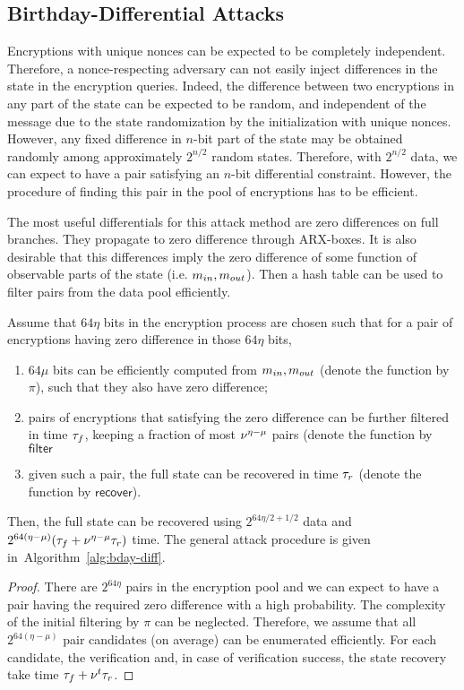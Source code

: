
\subsection{Birthday-Differential Attacks}

Encryptions with unique nonces can be expected to be completely independent. Therefore, a nonce-respecting adversary can not easily inject differences in the state in the encryption queries. Indeed, the difference between two encryptions in any part of the state can be expected to be random, and independent of the message due to the state randomization by the initialization with unique nonces. However, any fixed difference in $n$-bit part of the state may be obtained randomly among approximately $2^{n/2}$ random states. Therefore, with $2^{n/2}$ data, we can expect to have a pair satisfying an $n$-bit differential constraint. However, the procedure of finding this pair in the pool of encryptions has to be efficient.

The most useful differentials for this attack method are zero differences on full branches. They propagate to zero difference through ARX-boxes. It is also desirable that this differences imply the zero difference of some function of observable parts of the state (i.e. $m_{in}, m_{out}$). Then a hash table can be used to filter pairs from the data pool efficiently. 

\begin{proposition}
Assume that $64\eta$ bits in the encryption process are chosen such that for a pair of encryptions having zero difference in those $64\eta$ bits,
\begin{enumerate}
    \item $64\mu$ bits can be efficiently computed from $m_{in},m_{out}$ (denote the function by $\pi$), such that they also have zero difference;
    \item pairs of encryptions that satisfying the zero difference can be further filtered in time $\tau_f$, keeping a fraction of most $\nu^{\eta-\mu}$ pairs (denote the function by $\mathsf{filter}$
    \item given such a pair, the full state can be recovered in time $\tau_r$ (denote the function by $\mathsf{recover}$).
\end{enumerate}
Then, the full state can be recovered using $2^{64\eta/2+1/2}$ data and $2^{64(\eta-\mu)}(\tau_f + \nu^{\eta-\mu} \tau_r)$ time. The general attack procedure is given in~Algorithm~\ref{alg:bday-diff}.
\end{proposition}
\begin{proof}
There are $2^{64 \eta}$ pairs in the encryption pool and we can expect to have a pair having the required zero difference with a high probability. The complexity of the initial filtering by $\pi$ can be neglected. Therefore, we assume that all $2^{64(\eta - \mu)}$ pair candidates (on average) can be enumerated efficiently. For each candidate, the verification and, in case of verification success, the state recovery take time $\tau_f + \nu^t \tau_r$.
\end{proof}

